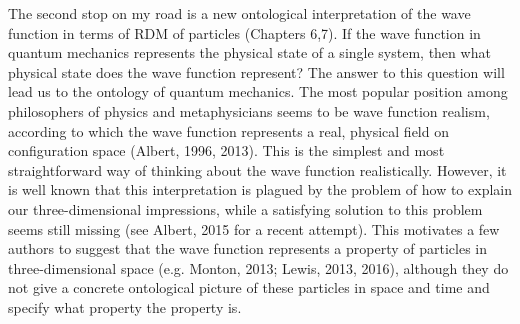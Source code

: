 
The second stop on my road is a new ontological interpretation of the wave function in terms of RDM of particles (Chapters 6,7).
If the wave function in quantum mechanics represents the physical state of a single system, then what physical state does the wave function represent? The answer to this question will lead us to the ontology of quantum mechanics.
The most popular position among philosophers of physics and metaphysicians seems to be wave function realism, according to which the wave function represents a real, physical field on configuration space (Albert, 1996, 2013).
This is the simplest and most straightforward way of thinking about the wave function realistically.
However, it is well known that this interpretation is plagued by the problem of how to explain our three-dimensional impressions, while a satisfying solution to this problem seems still missing (see Albert, 2015 for a recent attempt).
This motivates a few authors to suggest that the wave function represents a property of particles in three-dimensional space (e.g. Monton, 2013; Lewis, 2013, 2016), although they do not give a concrete ontological picture of these particles in space and time and specify what property the property is.

